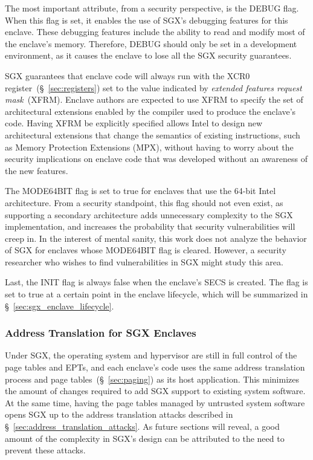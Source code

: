 The most important attribute, from a security perspective, is the DEBUG flag.
When this flag is set, it enables the use of SGX's debugging features for this
enclave. These debugging features include the ability to read and modify most
of the enclave's memory. Therefore, DEBUG should only be set in a development
environment, as it causes the enclave to lose all the SGX security guarantees.

SGX guarantees that enclave code will always run with the XCR0
register~(\S~\ref{sec:registers}) set to the value indicated by
\textit{extended features request mask}~(XFRM). Enclave authors are expected to
use XFRM to specify the set of architectural extensions enabled by the compiler
used to produce the enclave's code. Having XFRM be explicitly specified allows
Intel to design new architectural extensions that change the semantics of
existing instructions, such as Memory Protection Extensions (MPX), without
having to worry about the security implications on enclave code that was
developed without an awareness of the new features.

The MODE64BIT flag is set to true for enclaves that use the 64-bit Intel
architecture. From a security standpoint, this flag should not even exist, as
supporting a secondary architecture adds unnecessary complexity to the SGX
implementation, and increases the probability that security vulnerabilities
will creep in. In the interest of mental sanity, this work does not analyze the
behavior of SGX for enclaves whose MODE64BIT flag is cleared. However, a
security researcher who wishes to find vulnerabilities in SGX might study this
area.

Last, the INIT flag is always false when the enclave's SECS is created. The
flag is set to true at a certain point in the enclave lifecycle, which will be
summarized in \S~\ref{sec:sgx_enclave_lifecycle}.


\subsubsection{Address Translation for SGX Enclaves}
\label{sec:sgx_paging}


Under SGX, the operating system and hypervisor are still in full control of the
page tables and EPTs, and each enclave's code uses the same address translation
process and page tables~(\S~\ref{sec:paging}) as its host application. This
minimizes the amount of changes required to add SGX support to existing system
software. At the same time, having the page tables managed by untrusted system
software opens SGX up to the address translation attacks described in
\S~\ref{sec:address_translation_attacks}. As future sections will reveal, a
good amount of the complexity in SGX's design can be attributed to the need to
prevent these attacks.

